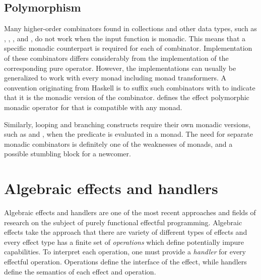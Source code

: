 


\subsection{Polymorphism}
Many higher-order combinators found in collections and other data types, such as , , , and , do not work when the input function is monadic. This means that a specific monadic counterpart is required for each of combinator. Implementation of these combinators differs considerably from the implementation of the corresponding pure operator. However, the implementations can usually be generalized to work with every monad including monad transformers. A convention originating from Haskell is to suffix such combinators with  to indicate that it is the monadic version of the combinator.  defines the effect polymorphic monadic  operator for  that is compatible with any monad.



Similarly, looping and branching constructs require their own monadic versions, such as  and , when the predicate is evaluated in a monad. The need for separate monadic combinators is definitely one of the weaknesses of monads, and a possible stumbling block for a newcomer.




\section{Algebraic effects and handlers} \label{algebraic-effects}
Algebraic effects and handlers are one of the most recent approaches and fields of research on the subject of purely functional effectful programming. Algebraic effects take the approach that there are variety of different types of effects and every effect type has a finite set of \emph{operations} which define potentially impure capabilities. To interpret each operation, one must provide a \emph{handler} for every effectful operation. Operations define the interface of the effect, while handlers define the semantics of each effect and operation.

